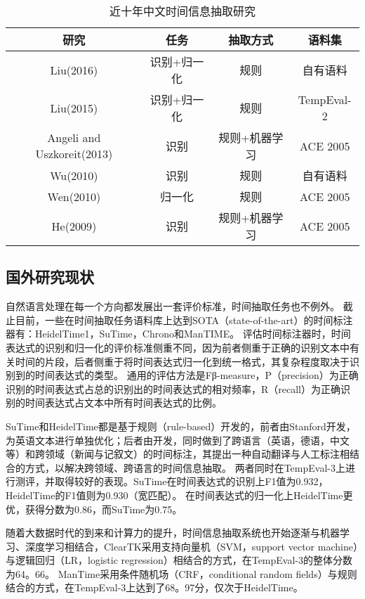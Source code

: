 \begin{table}[h]
    \centering
    \caption{近十年中文时间信息抽取研究}
    \begin{tabular}{*{4}{c}}
        \toprule
        研究      & 任务        & 抽取方式 & 语料集   \\
        \midrule
        Liu(2016) & 识别+归一化 & 规则     & 自有语料 \\
        Liu(2015) & 识别+归一化 & 规则 & TempEval-2 \\
        Angeli and Uszkoreit(2013) & 识别 & 规则+机器学习 & ACE 2005 \\
        Wu(2010) & 识别 & 规则 & 自有语料 \\
        Wen(2010) & 归一化 & 规则 & ACE 2005\\
        He(2009) & 识别 & 规则+机器学习 & ACE 2005\\
        \bottomrule
    \end{tabular}
    \label{tab:research}
\end{table}


\subsection{国外研究现状}

自然语言处理在每一个方向都发展出一套评价标准，时间抽取任务也不例外。
截止目前，一些在时间抽取任务语料库上达到SOTA（state-of-the-art）的时间标注器有：HeidelTime1\cite{strotgen2010heideltime}，SuTime\cite{chang2012sutime}，Chrono\cite{olex2018chrono}和ManTIME\cite{filannino2013mantime}。
评估时间标注器时，时间表达式的识别和归一化的评价标准侧重不同，因为前者侧重于正确的识别文本中有关时间的片段，后者侧重于将时间表达式归一化到统一格式，其复杂程度取决于识别到的时间表达式的类型。
通用的评估方法是Fβ-measure，P（precision）为正确识别的时间表达式占总的识别出的时间表达式的相对频率，R（recall）为正确识别的时间表达式占文本中所有时间表达式的比例。

SuTime和HeidelTime都是基于规则（rule-based）开发的，前者由Stanford开发，为英语文本进行单独优化；后者由\citet{strotgen2010heideltime}开发，同时做到了跨语言（英语，德语，中文等）和跨领域（新闻与记叙文）的时间标注，其提出一种自动翻译与人工标注相结合的方式，以解决跨领域、跨语言的时间信息抽取。
两者同时在TempEval-3上进行测评，并取得较好的表现。SuTime在时间表达式的识别上F1值为0.932，HeidelTime的F1值则为0.930（宽匹配）。
在时间表达式的归一化上HeidelTime更优，获得分数为0.86，而SuTime为0.75。

随着大数据时代的到来和计算力的提升，时间信息抽取系统也开始逐渐与机器学习、深度学习相结合，ClearTK\cite{bethard2013cleartk}采用支持向量机（SVM，support vector machine）与逻辑回归（LR，logistic regression）相结合的方式，在TempEval-3的整体分数为64。66。
ManTime\cite{filannino2013mantime}采用条件随机场（CRF，conditional random fields）与规则结合的方式，在TempEval-3上达到了68。97分，仅次于HeidelTime。

